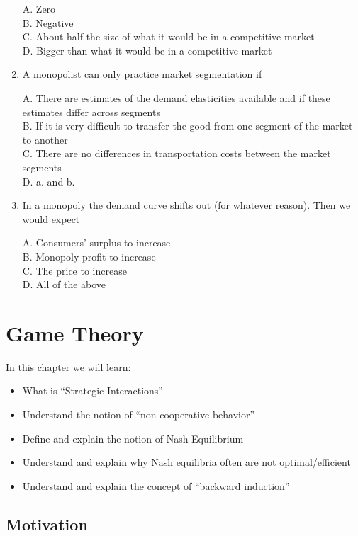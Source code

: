 \documentclass[
]{book}
\providecommand{\tightlist}{%
  \setlength{\itemsep}{0pt}\setlength{\parskip}{0pt}}
\begin{document}
\begin{enumerate}
  A. Zero\\
  B. Negative\\
  C. About half the size of what it would be in a competitive market\\
  D. Bigger than what it would be in a competitive market
\item
  A monopolist can only practice market segmentation if

  A. There are estimates of the demand elasticities available and if these estimates differ across segments\\
  B. If it is very difficult to transfer the good from one segment of the market to another\\
  C. There are no differences in transportation costs between the market segments\\
  D. a. and b.
\item
  In a monopoly the demand curve shifts out (for whatever reason). Then we would expect

  A. Consumers' surplus to increase\\
  B. Monopoly profit to increase\\
  C. The price to increase\\
  D. All of the above
\end{enumerate}

\hypertarget{game-theory}{%
\chapter{Game Theory}\label{game-theory}}

In this chapter we will learn:

\begin{itemize}
\tightlist
\item
  What is ``Strategic Interactions''
\item
  Understand the notion of ``non-cooperative behavior''
\item
  Define and explain the notion of Nash Equilibrium
\item
  Understand and explain why Nash equilibria often are not optimal/efficient
\item
  Understand and explain the concept of ``backward induction''
\end{itemize}

\hypertarget{motivation}{%
\section{Motivation}\label{motivation}}
\end{document}
